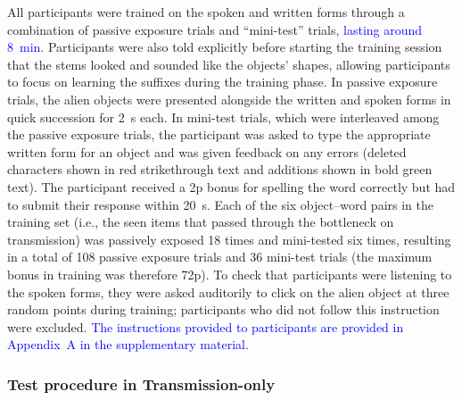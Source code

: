 \documentclass[doc,biblatex]{apa7}
\newcommand\newmaterial[1]{\textcolor{blue}{#1}}
\begin{document}
All participants were trained on the spoken and written forms through a combination of passive exposure trials and ``mini-test'' trials\newmaterial{, lasting around 8~min}. Participants were also told explicitly before starting the training session that the stems looked and sounded like the objects' shapes, allowing participants to focus on learning the suffixes during the training phase. In passive exposure trials, the alien objects were presented alongside the written and spoken forms in quick succession for 2~s each. In mini-test trials, which were interleaved among the passive exposure trials, the participant was asked to type the appropriate written form for an object and was given feedback on any errors (deleted characters shown in red strikethrough text and additions shown in bold green text). The participant received a 2p bonus for spelling the word correctly but had to submit their response within 20~s. Each of the six object--word pairs in the training set (i.e., the seen items that passed through the bottleneck on transmission) was passively exposed 18 times and mini-tested six times, resulting in a total of 108 passive exposure trials and 36 mini-test trials (the maximum bonus in training was therefore 72p). To check that participants were listening to the spoken forms, they were asked auditorily to click on the alien object at three random points during training; participants who did not follow this instruction were excluded. \newmaterial{The instructions provided to participants are provided in Appendix~A in the supplementary material.}

\subsubsection{Test procedure in Transmission-only}
\end{document}
